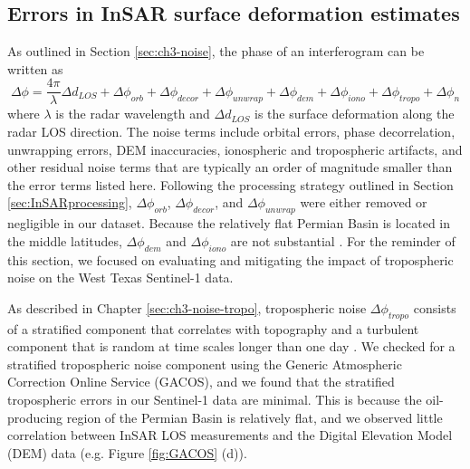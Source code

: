 \documentclass{utexasthesis}
\begin{document}
\subsection{Errors in InSAR surface deformation estimates}
\label{sec:errors} 
As outlined in Section \ref{sec:ch3-noise}, the phase of an interferogram can be written as \citep{Zebker1992DecorrelationInterferometricRadar, Zebker1994AccuracyTopographicMaps, Zebker1997AtmosphericEffectsInterferometric}
\begin{equation}
	\Delta \phi = \frac{4 \pi}{\lambda} \Delta d_{LOS} +  \Delta \phi_{orb} + \Delta \phi_{decor} + \Delta \phi_{unwrap}  + \Delta \phi_{dem} + \Delta \phi_{iono} + \Delta \phi_{tropo}  + \Delta \phi_{n}
\end{equation}
where $ \lambda $ is the radar wavelength and $ \Delta d_{LOS} $ is the surface deformation along the radar LOS direction. The noise terms include orbital errors, phase decorrelation, unwrapping errors, DEM inaccuracies, ionospheric and tropospheric artifacts, and other residual noise terms that are typically an order of magnitude smaller than the error terms listed here. Following the processing strategy outlined in Section \ref{sec:InSARprocessing}, $\Delta \phi_{orb}$, $\Delta \phi_{decor}$, and $\Delta \phi_{unwrap}$ were either removed or negligible in our dataset. Because the relatively flat Permian Basin is located in the middle latitudes, $\Delta \phi_{dem}$ and $\Delta \phi_{iono}$ are not substantial \citep{Fattahi2013DemErrorCorrection, Liang2019IonosphericCorrectionInsar}. For the reminder of this section, we focused on evaluating and mitigating the impact of tropospheric noise on the West Texas Sentinel-1 data.


%


As described in Chapter \ref{sec:ch3-noise-tropo}, tropospheric noise $\Delta \phi_{tropo}$ consists of a stratified component that correlates with topography \citep{Doin2009CorrectionsStratifiedTropospheric} and a turbulent component that is random at time scales longer than one day \citep{Emardson2003NeutralAtmosphericDelay}. We checked for a stratified tropospheric noise component using the Generic Atmospheric Correction Online Service (GACOS), and we found that the stratified tropospheric errors in our Sentinel-1 data are minimal. This is because the oil-producing region of the Permian Basin is relatively flat, and we observed little correlation between InSAR LOS measurements and the Digital Elevation Model (DEM) data (e.g. Figure \ref{fig:GACOS} (d)). 
\end{document}
